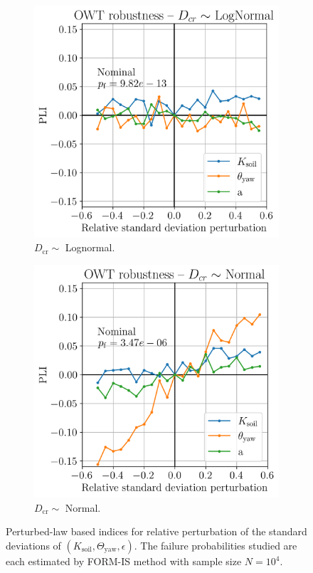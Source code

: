 \begin{figure}
    \centering
    \begin{subfigure}[t]{0.48\linewidth}
        \includegraphics[width=\linewidth]{./part3/figures/OWT/PLI_ALL_Hyp_LogNormal.png}
        \caption{$D_{\mathrm{cr}} \sim $ Lognormal.}
    \end{subfigure}
    \begin{subfigure}[t]{0.48\linewidth}
        \includegraphics[width=\linewidth]{./part3/figures/OWT/PLI_ALL_Hyp_Normal.png}
        \caption{$D_{\mathrm{cr}} \sim $ Normal.}
    \end{subfigure}
    \caption{Perturbed-law based indices for relative perturbation of the standard deviations of $(K_{\mathrm{soil}}, \Theta_{\mathrm{yaw}}, \epsilon)$. 
    The failure probabilities studied are each estimated by FORM-IS method with sample size $N=10^4$.}
    \label{fig:pli_all}
\end{figure}



